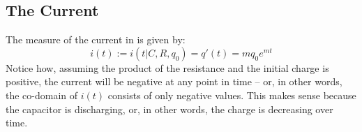 \documentclass{article}
\begin{document}
	\subsection[Current]{The Current}
	The measure of the current in is given by:
	$$ i(t) := i(t\vert C, R, q_0) = q'(t) = mq_0e^{mt}$$
	Notice how, assuming the product of the resistance and the initial charge 
	is positive, the current will be negative at any point in time -- or, in 
	other words, the co-domain of $i(t)$ consists of only negative values.  
	This makes sense because the capacitor is discharging, or, in other words, 
	the charge is decreasing over time.
\end{document}
